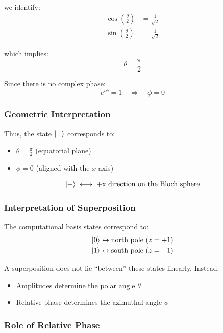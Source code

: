 we identify:
\begin{align}
\cos\left(\frac{\theta}{2}\right) &= \frac{1}{\sqrt{2}} \\
\sin\left(\frac{\theta}{2}\right) &= \frac{1}{\sqrt{2}}
\end{align}

which implies:
\begin{equation}
\theta = \frac{\pi}{2}
\end{equation}

Since there is no complex phase:
\begin{equation}
e^{i\phi} = 1 \quad \Rightarrow \quad \phi = 0
\end{equation}

\subsubsection*{Geometric Interpretation}

Thus, the state $\ket{+}$ corresponds to:
\begin{itemize}
\item $\theta = \frac{\pi}{2}$ (equatorial plane)
\item $\phi = 0$ (aligned with the $x$-axis)
\end{itemize}

\begin{equation}
\ket{+} \;\longleftrightarrow\; \text{+x direction on the Bloch sphere}
\end{equation}

\subsubsection*{Interpretation of Superposition}

The computational basis states correspond to:
\begin{align}
\ket{0} &\leftrightarrow \text{north pole } (z = +1) \\
\ket{1} &\leftrightarrow \text{south pole } (z = -1)
\end{align}

A superposition does not lie ``between'' these states linearly. Instead:
\begin{itemize}
\item Amplitudes determine the polar angle $\theta$
\item Relative phase determines the azimuthal angle $\phi$
\end{itemize}

\subsubsection*{Role of Relative Phase}

